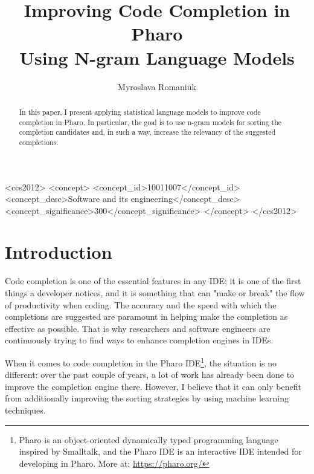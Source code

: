 \documentclass[sigconf,screen]{acmart}
\begin{document}
\title{Improving Code Completion in Pharo\\Using N-gram Language Models}
\author{Myroslava Romaniuk}
\begin{abstract}
In this paper, I present applying statistical language models to improve code completion in Pharo. In particular, the goal is to use n-gram models for sorting the completion candidates and, in such a way, increase the relevancy of the suggested completions.
\end{abstract}

\begin{CCSXML}
<ccs2012>
<concept>
<concept_id>10011007</concept_id>
<concept_desc>Software and its engineering</concept_desc>
<concept_significance>300</concept_significance>
</concept>
</ccs2012>
\end{CCSXML}


\maketitle

\section{Introduction}
Code completion is one of the essential features in any IDE; it is one of the first things a developer notices, and it is something that can "make or break" the flow of productivity when coding. The accuracy and the speed with which the completions are suggested are paramount in helping make the completion as effective as possible. That is why researchers and software engineers are continuously trying to find ways to enhance completion engines in IDEs.

When it comes to code completion in the Pharo IDE\footnote{Pharo is an object-oriented dynamically typed programming language inspired by Smalltalk, and the Pharo IDE is an interactive IDE intended for developing in Pharo. More at: \url{https://pharo.org/}}, the situation is no different: over the past couple of years, a lot of work has already been done to improve the completion engine there. However, I believe that it can only benefit from additionally improving the sorting strategies by using machine learning techniques.
\end{document}
